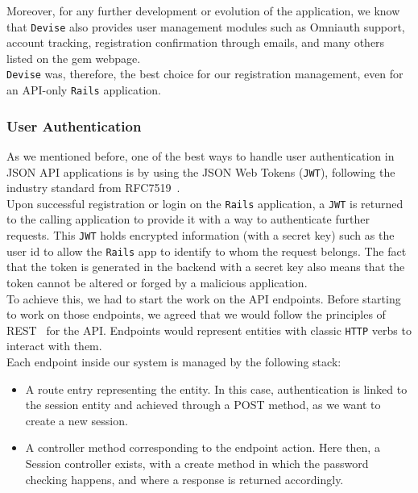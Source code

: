 \documentclass{eplmastersthesis}
\begin{document}
          Moreover, for any further development or evolution of the application,
          we know that \texttt{Devise} also provides user management modules such as
          Omniauth support, account tracking, registration confirmation
          through emails, and many others listed on the gem webpage.\\

          \texttt{Devise} was, therefore, the best choice for our registration management,
          even for an API-only \texttt{Rails} application.

        \subsubsection{User Authentication}

          As we mentioned before, one of the best ways to handle user
          authentication in JSON API applications is by using the JSON Web
          Tokens (\texttt{JWT}), following the industry standard from RFC7519~\cite{rfc7519}.\\

          Upon successful registration or login on the \texttt{Rails} application, a
          \texttt{JWT} is returned to the calling application to provide it with a way
          to authenticate further requests. This \texttt{JWT} holds encrypted
          information (with a secret key) such as the user id to allow the \texttt{Rails}
          app to identify to whom the request belongs. The fact that the token
          is generated in the backend with a secret key also means that the
          token cannot be altered or forged by a malicious application.\\

          To achieve this, we had to start the work on the API endpoints.
          Before starting to work on those endpoints, we agreed that we would
          follow the principles of REST~\cite{rest} for the API. Endpoints would
          represent entities with classic \texttt{HTTP} verbs to interact with them.\\

          Each endpoint inside our system is managed by the following stack:

          \begin{itemize}
            \item A route entry representing the entity. In this case,
            authentication is linked to the session entity and achieved through
            a POST method, as we want to create a new session.
            \item A controller method corresponding to the endpoint action.
            Here then, a Session controller exists, with a create method in
            which the password checking happens, and where a response is
            returned accordingly.
          \end{itemize}
\end{document}
